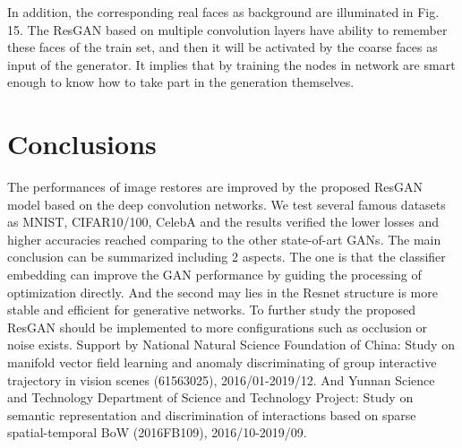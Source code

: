 \documentclass[publish,JACIII,paper]{jaciiiarticle}
\begin{document}


In addition, the corresponding real faces as background are illuminated in Fig. 15.
The ResGAN based on multiple convolution layers have ability to remember these faces of the train set,
and then it will be activated by the coarse faces as input of the generator.
It implies that by training the nodes in network are smart enough to know how to take part in the generation themselves.  







\section{Conclusions}
The performances of image restores are improved by the proposed ResGAN model based on the deep convolution networks.
We test several famous datasets as MNIST, CIFAR10/100, CelebA and the results verified the lower losses and higher accuracies reached comparing to the other state-of-art GANs.
The main conclusion can be summarized including 2 aspects.
The one is that the classifier embedding can improve the GAN performance by guiding the processing of optimization directly.
And the second may lies in the Resnet structure is more stable and efficient for generative networks.
To further study the proposed ResGAN should be implemented to more configurations such as occlusion or noise exists. 
\acknowledgements
Support by National Natural Science Foundation of China:
Study on manifold vector field learning and anomaly discriminating of group interactive trajectory in vision scenes (61563025), 2016/01-2019/12.
And Yunnan Science and Technology Department of Science and Technology Project:
Study on semantic representation and discrimination of interactions based on sparse spatial-temporal BoW (2016FB109), 2016/10-2019/09.






\end{document}
